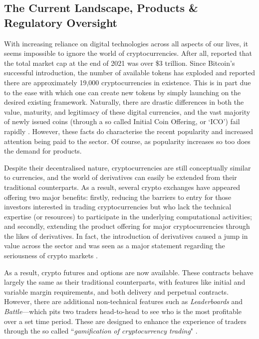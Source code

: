 \subsection{The Current Landscape, Products \& Regulatory Oversight}
With increasing reliance on digital technologies across all aspects of our lives, it seems impossible to ignore the world of cryptocurrencies. After all, \cite{bloomberg} reported that the total market cap at the end of 2021 was over \$3 trillion. Since Bitcoin's successful introduction, the number of available tokens has exploded and \cite{CNBC} reported there are approximately 19,000 cryptocurrencies in existence. This is in part due to the ease with which one can create new tokens by simply launching on the desired existing framework. Naturally, there are drastic differences in both the value, maturity, and legitimacy of these digital currencies, and the vast majority of newly issued coins (through a so called Initial Coin Offering, or `ICO') fail rapidly \citep{blaseg2018dynamics}. However, these facts do characterise the recent popularity and increased attention being paid to the sector. Of course, as popularity increases so too does the demand for products. 

Despite their decentralised nature, cryptocurrencies are still conceptually similar to currencies, and the world of derivatives can easily be extended from their traditional counterparts. As a result, several crypto exchanges have appeared offering two major benefits: firstly, reducing the barriers to entry for those investors interested in trading cryptocurrencies but who lack the technical expertise (or resources) to participate in the underlying computational activities; and secondly, extending the product offering for major cryptocurrencies through the likes of derivatives. In fact, the introduction of derivatives caused a jump in value across the sector and was seen as a major statement regarding the seriousness of crypto markets \citep{Gemeni}.

As a result, crypto futures and options are now available. These contracts behave largely the same as their traditional counterparts, with features like initial and variable margin requirements, and both delivery and perpetual contracts. However, there are additional non-technical features such as \textit{Leaderboards} and \textit{Battle}––which pits two traders head-to-head to see who is the most profitable over a set time period. These are designed to enhance the experience of traders through the so called ``\textit{gamification of cryptocurrency trading}" \citep{binance}.

